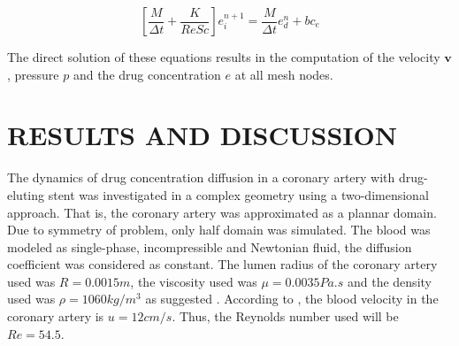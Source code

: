 \documentclass[10pt,fleqn,a4paper,twoside]{article}
\begin{document}
\begin{equation*}
 \left[ \frac{M}{\Delta t} + \frac{K}{ReSc} \right] e_{i}^{n+1} = \frac{M}{\Delta t} e_{d}^{n} + bc_{e}
\end{equation*}

The direct solution of these equations results 
in the computation of the velocity $\textbf{v}$,
pressure $p$ and the drug concentration $e$ at all mesh nodes.

\section{RESULTS AND DISCUSSION}


The dynamics of drug concentration diffusion in a coronary 
artery with drug-eluting
stent was investigated in a complex geometry using a 
two-dimensional approach.
That is, the coronary artery was approximated as a plannar domain. 
Due to symmetry
of problem, only half domain was simulated. 
The blood was modeled as single-phase,
incompressible and Newtonian fluid, 
the diffusion coefficient was considered as constant.
The lumen radius of the coronary artery used was
$R=0.0015m$, 
the viscosity used was $\mu=0.0035Pa.s$ and the density used was
$\rho=1060kg/m^3$ as suggested \cite{bozsak2014}. 
According to \cite{kessler1998}, 
the blood velocity in the coronary artery 
is $u=12cm/s$. Thus, the Reynolds number used will be 
$Re=54.5$. 
\end{document}

